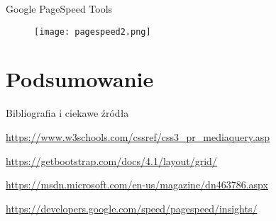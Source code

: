 \begin{frame}{Google PageSpeed Tools}
	\begin{figure}[t]
		\centering
		\texttt{[image: pagespeed2.png]}
	\end{figure}
\end{frame}

\section{Podsumowanie}

\begin{frame}{Bibliografia i ciekawe źródła}
  
	\begin{thebibliography}{9}
		
		\url{https://www.w3schools.com/cssref/css3_pr_mediaquery.asp}
		
		\url{https://getbootstrap.com/docs/4.1/layout/grid/}
		
		\url{https://msdn.microsoft.com/en-us/magazine/dn463786.aspx}
		
		\url{https://developers.google.com/speed/pagespeed/insights/}
		
	\end{thebibliography}

\end{frame}

